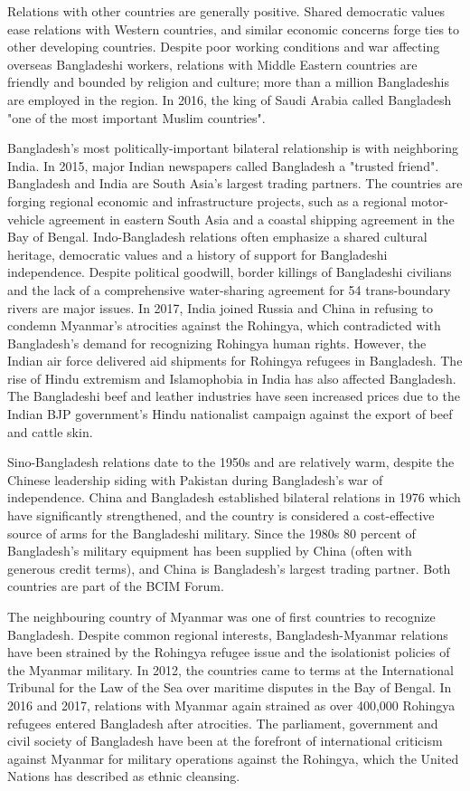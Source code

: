 Relations with other countries are generally positive. Shared democratic
values ease relations with Western countries, and similar economic
concerns forge ties to other developing countries. Despite poor working
conditions and war affecting overseas Bangladeshi workers, relations
with Middle Eastern countries are friendly and bounded by religion and
culture; more than a million Bangladeshis are employed in the region. In
2016, the king of Saudi Arabia called Bangladesh "one of the most
important Muslim countries".

Bangladesh's most politically-important bilateral relationship is with
neighboring India. In 2015, major Indian newspapers called Bangladesh a
"trusted friend". Bangladesh and India are South Asia's largest trading
partners. The countries are forging regional economic and infrastructure
projects, such as a regional motor-vehicle agreement in eastern South
Asia and a coastal shipping agreement in the Bay of Bengal.
Indo-Bangladesh relations often emphasize a shared cultural heritage,
democratic values and a history of support for Bangladeshi independence.
Despite political goodwill, border killings of Bangladeshi civilians and
the lack of a comprehensive water-sharing agreement for 54
trans-boundary rivers are major issues. In 2017, India joined Russia and
China in refusing to condemn Myanmar's atrocities against the Rohingya,
which contradicted with Bangladesh's demand for recognizing Rohingya
human rights. However, the Indian air force delivered aid shipments for
Rohingya refugees in Bangladesh. The rise of Hindu extremism and
Islamophobia in India has also affected Bangladesh. The Bangladeshi beef
and leather industries have seen increased prices due to the Indian BJP
government's Hindu nationalist campaign against the export of beef and
cattle skin.

Sino-Bangladesh relations date to the 1950s and are relatively warm,
despite the Chinese leadership siding with Pakistan during Bangladesh's
war of independence. China and Bangladesh established bilateral
relations in 1976 which have significantly strengthened, and the country
is considered a cost-effective source of arms for the Bangladeshi
military. Since the 1980s 80 percent of Bangladesh's military equipment
has been supplied by China (often with generous credit terms), and China
is Bangladesh's largest trading partner. Both countries are part of the
BCIM Forum.

The neighbouring country of Myanmar was one of first countries to
recognize Bangladesh. Despite common regional interests,
Bangladesh-Myanmar relations have been strained by the Rohingya refugee
issue and the isolationist policies of the Myanmar military. In 2012,
the countries came to terms at the International Tribunal for the Law of
the Sea over maritime disputes in the Bay of Bengal. In 2016 and 2017,
relations with Myanmar again strained as over 400,000 Rohingya refugees
entered Bangladesh after atrocities. The parliament, government and
civil society of Bangladesh have been at the forefront of international
criticism against Myanmar for military operations against the Rohingya,
which the United Nations has described as ethnic cleansing.

